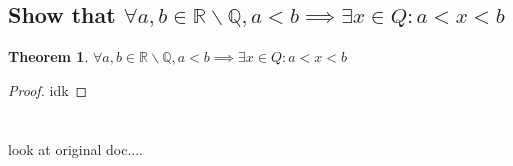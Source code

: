 \documentclass[]{article}
\newcommand{\R}{\mathbb{R}}
\newcommand{\Q}{\mathbb{Q}}
\newtheorem{theorem}{Theorem}
\begin{document}
\subsection{Show that
    $\forall a,b \in \R \backslash \Q, a < b \implies \exists x \in Q : a < x < b$
}
\begin{theorem}
    $\forall a,b \in \R \backslash \Q, a < b \implies \exists x \in Q : a < x < b$
\end{theorem}
\begin{proof}
    idk
\end{proof}






\newpage
\section{}

\subsection{}
look at original doc....
\end{document}
